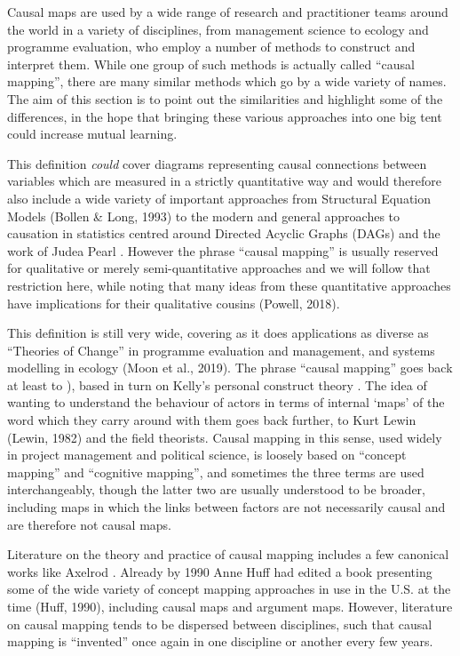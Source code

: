 \documentclass[
]{book}
\begin{document}
Causal maps are used by a wide range of research and practitioner teams around the world in a variety of disciplines, from management science to ecology and programme evaluation, who employ a number of methods to construct and interpret them. While one group of such methods is actually called ``causal mapping'', there are many similar methods which go by a wide variety of names. The aim of this section is to point out the similarities and highlight some of the differences, in the hope that bringing these various approaches into one big tent could increase mutual learning.

This definition \emph{could} cover diagrams representing causal connections between variables which are measured in a strictly quantitative way and would therefore also include a wide variety of important approaches from Structural Equation Models (Bollen \& Long, 1993) to the modern and general approaches to causation in statistics centred around Directed Acyclic Graphs (DAGs) and the work of Judea Pearl \citep{pearl2018}. However the phrase ``causal mapping'' is usually reserved for qualitative or merely semi-quantitative approaches and we will follow that restriction here, while noting that many ideas from these quantitative approaches have implications for their qualitative cousins (Powell, 2018).

This definition is still very wide, covering as it does applications as diverse as ``Theories of Change'' in programme evaluation and management, and systems modelling in ecology (Moon et al., 2019). The phrase ``causal mapping'' goes back at least to \citep{axelrod2015}), based in turn on Kelly's personal construct theory \citep{kellyPersonalConstructTheory1955}. The idea of wanting to understand the behaviour of actors in terms of internal `maps' of the word which they carry around with them goes back further, to Kurt Lewin (Lewin, 1982) and the field theorists. Causal mapping in this sense, used widely in project management and political science, is loosely based on ``concept mapping'' and ``cognitive mapping'', and sometimes the three terms are used interchangeably, though the latter two are usually understood to be broader, including maps in which the links between factors are not necessarily causal and are therefore not causal maps.

Literature on the theory and practice of causal mapping includes a few canonical works like Axelrod \citep{axelrod2015}. Already by 1990 Anne Huff had edited a book presenting some of the wide variety of concept mapping approaches in use in the U.S. at the time (Huff, 1990), including causal maps and argument maps. However, literature on causal mapping tends to be dispersed between disciplines, such that causal mapping is ``invented'' once again in one discipline or another every few years.
\end{document}
